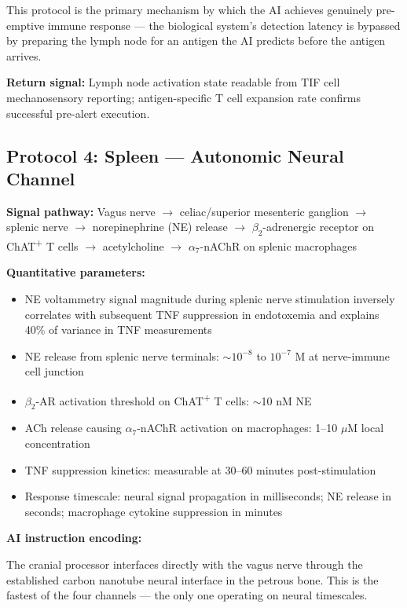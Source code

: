 \documentclass[12pt]{article}
\begin{document}
This protocol is the primary mechanism by which the AI achieves genuinely pre-emptive immune response --- the biological system's detection latency is bypassed by preparing the lymph node for an antigen the AI predicts before the antigen arrives.

\textbf{Return signal:} Lymph node activation state readable from TIF cell mechanosensory reporting; antigen-specific T cell expansion rate confirms successful pre-alert execution.

\subsection{Protocol 4: Spleen --- Autonomic Neural Channel}

\textbf{Signal pathway:} Vagus nerve $\to$ celiac/superior mesenteric ganglion $\to$ splenic nerve $\to$ norepinephrine (NE) release $\to$ $\beta_2$-adrenergic receptor on ChAT\textsuperscript{+} T cells $\to$ acetylcholine $\to$ $\alpha_7$-nAChR on splenic macrophages

\textbf{Quantitative parameters:}
\begin{itemize}
    \item NE voltammetry signal magnitude during splenic nerve stimulation inversely correlates with subsequent TNF suppression in endotoxemia and explains 40\% of variance in TNF measurements \cite{splenic_voltammetry_2023}
    \item NE release from splenic nerve terminals: $\sim 10^{-8}$ to $10^{-7}$ M at nerve-immune cell junction
    \item $\beta_2$-AR activation threshold on ChAT\textsuperscript{+} T cells: $\sim$10 nM NE
    \item ACh release causing $\alpha_7$-nAChR activation on macrophages: 1--10 $\mu$M local concentration
    \item TNF suppression kinetics: measurable at 30--60 minutes post-stimulation
    \item Response timescale: neural signal propagation in milliseconds; NE release in seconds; macrophage cytokine suppression in minutes
\end{itemize}

\textbf{AI instruction encoding:}

The cranial processor interfaces directly with the vagus nerve through the established carbon nanotube neural interface in the petrous bone. This is the fastest of the four channels --- the only one operating on neural timescales.
\end{document}
